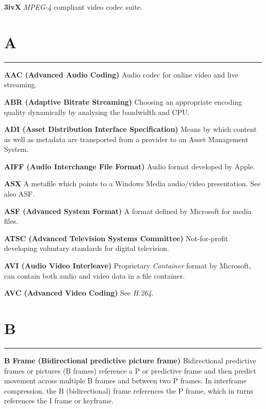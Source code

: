 
\textbf{3ivX}
\textit{MPEG-4} compliant video codec suite.

\section{A}
\hrule

\medskip
\textbf{AAC (Advanced Audio Coding)}
Audio codec for online video and live streaming.

\smallskip
\textbf{ABR (Adaptive Bitrate Streaming)}
Choosing an appropriate encoding quality dynamically by analysing the bandwidth and CPU.

\smallskip
\textbf{ADI (Asset Distribution Interface Specification)}
Means by which content as well as metadata are transported from a provider to an Asset Management System.

\smallskip
\textbf{AIFF (Audio Interchange File Format)}
Audio format developed by Apple.

\smallskip
\textbf{ASX}
A metafile which points to a Windows Media audio/video presentation. See also ASF.

\smallskip
\textbf{ASF (Advanced System Format)}
A format defined by Microsoft for media files.

\smallskip
\textbf{ATSC (Advanced Television Systems Committee)}
Not-for-profit developing voluntary standards for digital television.

\smallskip
\textbf{AVI (Audio Video Interleave)}
Proprietary \textit{Container} format by Microsoft, can contain both audio and video data in a file container.

\smallskip
\textbf{AVC (Advanced Video Coding)}
See \textit{H.264}.



\section{B}
\hrule

\medskip
\textbf{B Frame (Bidirectional predictive picture frame)}
Bidirectional predictive frames or pictures (B frames) reference a P or predictive frame and then predict movement across multiple B frames and between two P frames. In interframe compression, the B (bidirectional) frame references the P frame, which in turns references the I frame or keyframe.


